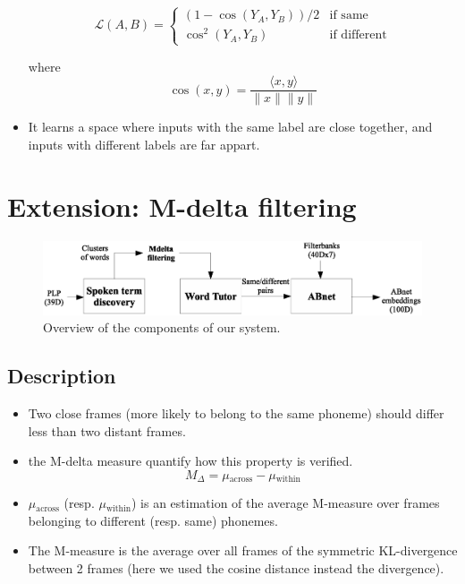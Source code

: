 \documentclass[final]{beamer}
\newcommand{\norm}[1]{\lVert#1\rVert}
\newcommand{\tup}[1]{\langle#1\rangle}
\begin{document}
\begin{frame}[t]
\begin{multicols}{3}
\begin{itemize}
\[
\mathcal{L}(A, B) =
\begin{cases}
(1-\cos(Y_A, Y_B)) / 2 & \text{if same} \\
\cos^2(Y_A, Y_B)       & \text{if different}
\end{cases}
\]

\noindent        
where $$\cos(x, y) = \frac{\tup{x, y}}{\norm{x}\norm{y}}$$

\item It learns a space where inputs with the same label are close together, and inputs with different labels are far appart. 
\end{itemize}


\section{Extension: M-delta filtering}

\begin{figure}[ht!]
  \begin{center}
    \includegraphics[width=\columnwidth]{system_mdelta}
    \caption{\label{fig:system}Overview of the components of our system.}
  \end{center}
\end{figure}

\subsection{Description}
\begin{itemize}
\item Two close frames (more likely to belong to the same phoneme) should differ less than two distant frames.
\item the M-delta measure\cite{ogawaetal2015} quantify how this property is verified.
$$M_\Delta = \mu{}_{\mathrm{across}} - \mu{}_{\mathrm{within}}$$
\item $\mu{}_{\mathrm{across}}$ (resp. $\mu{}_{\mathrm{within}}$) is an estimation of the average M-measure over frames belonging to different (resp. same) phonemes.
\item The M-measure is the average over all frames of the symmetric KL-divergence between 2 frames (here we used the cosine distance instead the divergence).
\end{itemize}


\end{multicols}
\end{frame}
\end{document}
